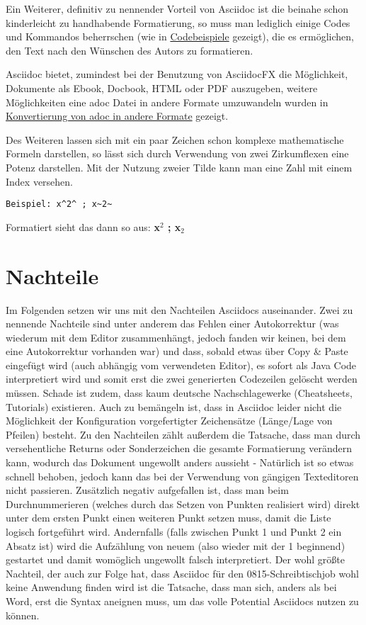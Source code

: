 \documentclass[11pt]{amsbook}
\begin{document}
Ein Weiterer, definitiv zu nennender Vorteil von Asciidoc ist die beinahe schon kinderleicht zu handhabende Formatierung, so muss man lediglich einige Codes und Kommandos beherrschen (wie in \hyperlink{x-codebeispiele}{Codebeispiele} gezeigt), die es ermöglichen, den Text nach den Wünschen des Autors zu formatieren.


Asciidoc bietet, zumindest bei der Benutzung von AsciidocFX die Möglichkeit, Dokumente als Ebook, Docbook, HTML oder PDF auszugeben, weitere Möglichkeiten eine adoc Datei in andere Formate umzuwandeln wurden in \hyperlink{x-konvertierung-von-adoc-in-andere-formate}{Konvertierung von adoc in andere Formate} gezeigt.


Des Weiteren lassen sich mit ein paar Zeichen schon komplexe mathematische Formeln darstellen, so lässt sich durch Verwendung von zwei Zirkumflexen eine Potenz darstellen. Mit der Nutzung zweier Tilde kann man eine Zahl mit einem Index versehen.


\begin{verbatim}
Beispiel: x^2^ ; x~2~
\end{verbatim}

Formatiert sieht das dann so aus:\textbf{ x${}^{2}$ ; x${}_{2}$}


\hypertarget{x-nachteile}{\section*{Nachteile}}
Im Folgenden setzen wir uns mit den Nachteilen Asciidocs auseinander.
Zwei zu nennende Nachteile sind unter anderem das Fehlen einer Autokorrektur (was wiederum mit dem Editor zusammenhängt, jedoch fanden wir keinen, bei dem eine Autokorrektur vorhanden war) und dass, sobald etwas über Copy & Paste eingefügt wird (auch abhängig vom verwendeten Editor), es sofort als Java Code interpretiert wird und somit erst die zwei generierten Codezeilen gelöscht werden müssen.
Schade ist zudem, dass kaum deutsche Nachschlagewerke (Cheatsheets, Tutorials) existieren.
Auch zu bemängeln ist, dass in Asciidoc leider nicht die Möglichkeit der Konfiguration vorgefertigter Zeichensätze (Länge/Lage von Pfeilen) besteht.
Zu den Nachteilen zählt außerdem die Tatsache, dass man durch versehentliche Returns oder Sonderzeichen die gesamte Formatierung verändern kann, wodurch das Dokument ungewollt anders aussieht - Natürlich ist so etwas schnell behoben, jedoch kann das bei der Verwendung von gängigen Texteditoren nicht passieren.
Zusätzlich negativ aufgefallen ist, dass man beim Durchnummerieren (welches durch das Setzen von Punkten realisiert wird) direkt unter dem ersten Punkt einen weiteren Punkt setzen muss, damit die Liste logisch fortgeführt wird. Andernfalls (falls zwischen Punkt 1 und Punkt 2 ein Absatz ist) wird die Aufzählung von neuem (also wieder mit der 1 beginnend) gestartet und damit womöglich ungewollt falsch interpretiert.
Der wohl größte Nachteil, der auch zur Folge hat, dass Asciidoc für den 0815-Schreibtischjob wohl keine Anwendung finden wird ist die Tatsache, dass man sich, anders als bei Word, erst die Syntax aneignen muss, um das volle Potential Asciidocs nutzen zu können.
\end{document}
